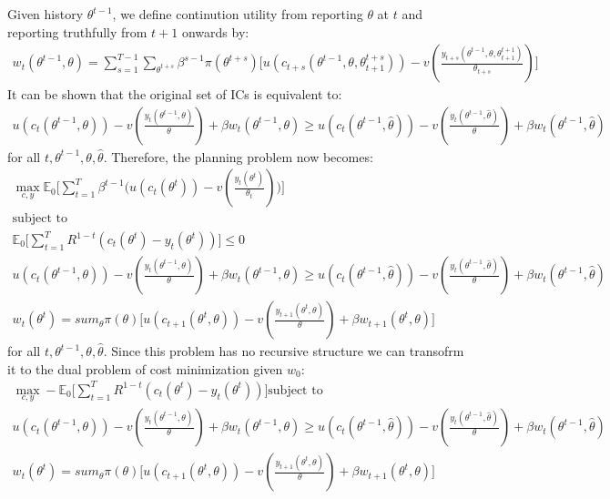 \documentclass{article}
\begin{document}
Given history $\theta^{t-1}$, we define continution utility from reporting $\theta$ at $t$ and reporting truthfully from $t+1$ onwards by:
\begin{gather*}
    w_{t}(\theta^{t-1}, \theta) = \sum_{s=1}^{T-1}\sum_{\theta^{t+s}} \beta^{s-1} \pi(\theta^{t+s}) \big[ u(c_{t+s}(\theta^{t-1},\theta,\theta_{t+1}^{t+s})) - v(\frac{y_{t+s}(\theta^{t-1}, \theta, \theta^{t+1}_{t+1})}{\theta_{t+s}}) \big]
\end{gather*}
It can be shown that the original set of ICs is equivalent to:
\begin{gather*}
    u(c_{t}(\theta^{t-1}, \theta)) - v(\frac{y_{t}(\theta^{t-1},\theta)}{\theta}) + \beta w_{t}(\theta^{t-1},\theta) \geq u(c_{t}(\theta^{t-1}, \widehat{\theta})) - v(\frac{y_{t}(\theta^{t-1},\widehat{\theta})}{\theta}) + \beta w_{t}(\theta^{t-1}, \widehat{\theta})
\end{gather*}
for all $t, \theta^{t-1}, \theta, \widehat{\theta}$. Therefore, the planning problem now becomes:
\begin{gather*}
    \max_{c,y} \mathbb{E}_{0} \bigg[\sum_{t=1}^{T} \beta^{t-1} \big(u(c_{t}(\theta^{t})) - v(\frac{y_{t}(\theta^{t})}{\theta_{t}}) \big) \bigg] \\
    \text{subject to} \\
    \mathbb{E}_{0} \big[\sum_{t=1}^{T} R^{1-t} (c_{t}(\theta^{t}) - y_{t}(\theta^{t})) \big] \leq 0 \\
    u(c_{t}(\theta^{t-1}, \theta)) - v(\frac{y_{t}(\theta^{t-1},\theta)}{\theta}) + \beta w_{t}(\theta^{t-1},\theta) \geq u(c_{t}(\theta^{t-1}, \widehat{\theta})) - v(\frac{y_{t}(\theta^{t-1},\widehat{\theta})}{\theta}) + \beta w_{t}(\theta^{t-1}, \widehat{\theta}) \\
    w_{t}(\theta^{t}) = sum_{\theta} \pi(\theta) \big[u(c_{t+1}(\theta^{t}, \theta)) - v(\frac{y_{t+1}(\theta^{t}, \theta)}{\theta}) + \beta w_{t+1}(\theta^{t}, \theta) \big]
\end{gather*}
for all $t, \theta^{t-1}, \theta, \widehat{\theta}$. Since this problem has no recursive structure we can transofrm it to the dual problem of cost minimization given $w_{0}$:
\begin{gather*}
    \max_{c,y} - \mathbb{E}_{0} \big[\sum_{t=1}^{T} R^{1-t} (c_{t}(\theta^{t}) - y_{t}(\theta^{t})) \big]
    \text{subject to} \\
    u(c_{t}(\theta^{t-1}, \theta)) - v(\frac{y_{t}(\theta^{t-1},\theta)}{\theta}) + \beta w_{t}(\theta^{t-1},\theta) \geq u(c_{t}(\theta^{t-1}, \widehat{\theta})) - v(\frac{y_{t}(\theta^{t-1},\widehat{\theta})}{\theta}) + \beta w_{t}(\theta^{t-1}, \widehat{\theta}) \\
    w_{t}(\theta^{t}) = sum_{\theta} \pi(\theta) \big[u(c_{t+1}(\theta^{t}, \theta)) - v(\frac{y_{t+1}(\theta^{t}, \theta)}{\theta}) + \beta w_{t+1}(\theta^{t}, \theta) \big]
\end{gather*}
\end{document}
